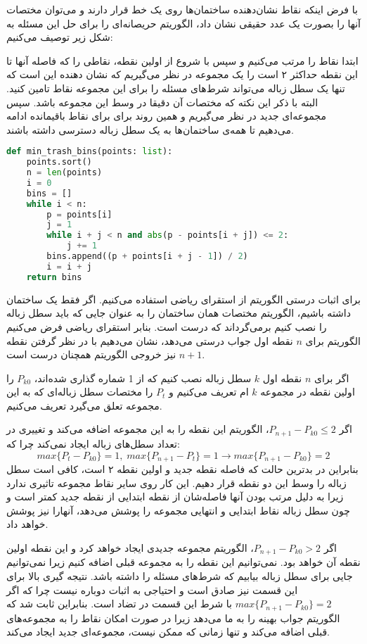 \documentclass[]{article}
\begin{document}
با فرض اینکه نقاط نشان‌دهنده ساختمان‌ها روی یک خط قرار دارند و می‌توان مختصات آنها را بصورت یک عدد حقیقی
نشان داد، الگوریتم حریصانه‌ای را برای حل این مسئله به شکل زیر توصیف می‌کنیم:

ابتدا نقاط را مرتب می‌کنیم و سپس با شروع از اولین نقطه، نقاطی را که فاصله آنها تا این نقطه حداکثر ۲ است را
یک مجموعه در نظر می‌گیریم که نشان دهنده این است که تنها یک سطل زباله می‌تواند شرط‌های مسئله را
برای این مجموعه نقاط تامین کنید. البته با ذکر این نکته که مختصات آن دقیقا در وسط این مجموعه باشد.
سپس مجموعه‌ای جدید در نظر می‌گیریم و همین روند برای برای نقاط باقیمانده ادامه می‌دهیم تا همه‌ی ساختمان‌ها
به یک سطل زباله دسترسی داشته باشند.

\begin{latin}
\begin{lstlisting}[language=python]
def min_trash_bins(points: list):
    points.sort()
    n = len(points)
    i = 0
    bins = []
    while i < n:
        p = points[i]
        j = 1
        while i + j < n and abs(p - points[i + j]) <= 2:
            j += 1
        bins.append((p + points[i + j - 1]) / 2)
        i = i + j
    return bins
\end{lstlisting}
\end{latin}

برای اثبات درستی الگوریتم از استقرای ریاضی استفاده می‌کنیم. اگر فقط یک ساختمان داشته باشیم،
الگوریتم مختصات همان ساختمان را به عنوان جایی که باید سطل زباله را نصب کنیم برمی‌گرداند که درست است.
بنابر استقرای ریاضی فرض می‌کنیم الگوریتم برای $n$ نقطه اول جواب درستی می‌دهد،
نشان می‌دهیم با در نظر گرفتن نقطه $n + 1$ نیز خروجی الگوریتم همچنان درست است.

اگر برای $n$ نقطه اول $k$ سطل زباله نصب کنیم که از 1 شماره گذاری شده‌اند، $P_{k0}$ را اولین نقطه در مجموعه
$k$ ام تعریف می‌کنیم و $P_{t}$ را مختصات سطل زباله‌ای که به این مجموعه تعلق می‌گیرد تعریف می‌کنیم.

اگر $P_{n+1} - P_{k0} \le 2$، الگوریتم این نقطه را به این مجموعه اضافه می‌کند و تغییری در تعداد سطل‌های زباله ایجاد نمی‌کند
چرا که:
$$max \lbrace P_t - P_{k0} \rbrace = 1, \; max \lbrace P_{n+1} - P_{t} \rbrace = 1 \rightarrow
max \lbrace P_{n+1} - P_{k0} \rbrace = 2$$
بنابراین در بدترین حالت که فاصله نقطه جدید و اولین نقطه ۲ است، کافی است سطل زباله را وسط این دو نقطه
قرار دهیم. این کار روی سایر نقاط مجموعه تاثیری ندارد زیرا به دلیل مرتب بودن آنها فاصله‌شان از نقطه ابتدایی از نقطه جدید کمتر است
و چون سطل زباله نقاط ابتدایی و انتهایی مجموعه را پوشش می‌دهد، آنهارا نیز پوشش خواهد داد.

اگر $P_{n+1} - P_{k0} > 2$، الگوریتم مجموعه جدیدی ایجاد خواهد کرد و این نقطه اولین نقطه آن خواهد بود.
نمی‌توانیم این نقطه را به مجموعه قبلی اضافه کنیم زیرا نمی‌توانیم جایی برای سطل زباله بیابیم که شرط‌های مسئله را داشته باشد.
نتیجه گیری بالا برای این قسمت نیز صادق است و احتیاجی به اثبات دوباره نیست چرا که اگر
$max \lbrace P_{n+1} - P_{k0} \rbrace = 2$ با شرط این قسمت در تضاد است.
بنابراین ثابت شد که الگوریتم جواب بهینه را به ما می‌دهد زیرا در صورت امکان نقاط را به مجموعه‌های
قبلی اضافه می‌کند و تنها زمانی که ممکن نیست، مجموعه‌ای جدید ایجاد می‌کند.
\end{document}
